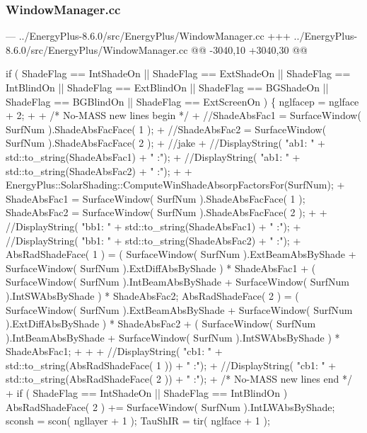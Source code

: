  

\subsubsection*{Window\+Manager.\+cc}




\begin{DoxyCode}
--- ../EnergyPlus-8.6.0/src/EnergyPlus/WindowManager.cc
+++ ../EnergyPlus-8.6.0/src/EnergyPlus/WindowManager.cc
@@ -3040,10 +3040,30 @@

        if ( ShadeFlag == IntShadeOn || ShadeFlag == ExtShadeOn || ShadeFlag == IntBlindOn || ShadeFlag ==
       ExtBlindOn || ShadeFlag == BGShadeOn || ShadeFlag == BGBlindOn || ShadeFlag == ExtScreenOn ) \{
            nglfacep = nglface + 2;
+           
+           /* No-MASS new lines begin */
+           //ShadeAbsFac1 = SurfaceWindow( SurfNum ).ShadeAbsFacFace( 1 );
+           //ShadeAbsFac2 = SurfaceWindow( SurfNum ).ShadeAbsFacFace( 2 );
+                       //jake
+           //DisplayString( "ab1: " + std::to\_string(ShadeAbsFac1) + " :");
+           //DisplayString( "ab1: " + std::to\_string(ShadeAbsFac2) + " :");
+
+           EnergyPlus::SolarShading::ComputeWinShadeAbsorpFactorsFor(SurfNum);
+
            ShadeAbsFac1 = SurfaceWindow( SurfNum ).ShadeAbsFacFace( 1 );
            ShadeAbsFac2 = SurfaceWindow( SurfNum ).ShadeAbsFacFace( 2 );
+
+           //DisplayString( "bb1: " + std::to\_string(ShadeAbsFac1) + " :");
+           //DisplayString( "bb1: " + std::to\_string(ShadeAbsFac2) + " :");
+
            AbsRadShadeFace( 1 ) = ( SurfaceWindow( SurfNum ).ExtBeamAbsByShade + SurfaceWindow( SurfNum
       ).ExtDiffAbsByShade ) * ShadeAbsFac1 + ( SurfaceWindow( SurfNum ).IntBeamAbsByShade + SurfaceWindow( SurfNum
       ).IntSWAbsByShade ) * ShadeAbsFac2;
            AbsRadShadeFace( 2 ) = ( SurfaceWindow( SurfNum ).ExtBeamAbsByShade + SurfaceWindow( SurfNum
       ).ExtDiffAbsByShade ) * ShadeAbsFac2 + ( SurfaceWindow( SurfNum ).IntBeamAbsByShade + SurfaceWindow( SurfNum
       ).IntSWAbsByShade ) * ShadeAbsFac1;
+
+
+           //DisplayString( "cb1: " + std::to\_string(AbsRadShadeFace( 1 )) + " :");
+           //DisplayString( "cb1: " + std::to\_string(AbsRadShadeFace( 2 )) + " :"); 
+           /* No-MASS new lines end */
+           
            if ( ShadeFlag == IntShadeOn || ShadeFlag == IntBlindOn ) AbsRadShadeFace( 2 ) +=
       SurfaceWindow( SurfNum ).IntLWAbsByShade;
            sconsh = scon( ngllayer + 1 );
            TauShIR = tir( nglface + 1 );
\end{DoxyCode}




